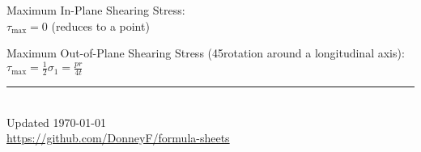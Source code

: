 \documentclass[10pt,landscape]{article}
\newcommand{\tab}{\hspace{.02\textwidth}}
\newcommand{\ds}{\displaystyle}
\begin{document}
\begin{multicols}{3}
Maximum In-Plane Shearing Stress:\\
\tab $\ds \tau_{\text{max}} = 0$ (reduces to a point)

Maximum Out-of-Plane Shearing Stress (45\degree rotation around a longitudinal axis):\\
\tab $\ds \tau_{\text{max}} = \frac{1}{2}\sigma_1 = \frac{pr}{4t}$

\rule{0.3\linewidth}{0.25pt}
\scriptsize\\
Updated \today\\
\href{https://github.com/DonneyF/formula-sheets}{https://github.com/DonneyF/formula-sheets}

\end{multicols}
\end{document}
